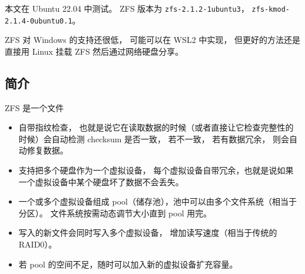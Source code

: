

本文在 Ubuntu 22.04 中测试。 ZFS 版本为 \verb`zfs-2.1.2-1ubuntu3`， \verb`zfs-kmod-2.1.4-0ubuntu0.1`。

ZFS 对 Windows 的支持还很低， 可能可以在 WSL2 中实现， 但更好的方法还是直接用 Linux 挂载 ZFS 然后通过网络硬盘分享。

\subsection{简介}
ZFS 是一个文件
\begin{itemize}
\item 自带指纹检查， 也就是说它在读取数据的时候（或者直接让它检查完整性的时候）会自动检测 checksum 是否一致， 若不一致， 若有数据冗余， 则会自动修复数据。
\item 支持把多个硬盘作为一个虚拟设备， 每个虚拟设备自带冗余，也就是说如果一个虚拟设备中某个硬盘坏了数据不会丢失。
\item 一个或多个虚拟设备组成 pool（储存池），池中可以由多个文件系统（相当于分区）。 文件系统按需动态调节大小直到 pool 用完。
\item 写入的新文件会同时写入多个虚拟设备， 增加读写速度（相当于传统的 RAID0）。
\item 若 pool 的空间不足，随时可以加入新的虚拟设备扩充容量。
\end{itemize}

